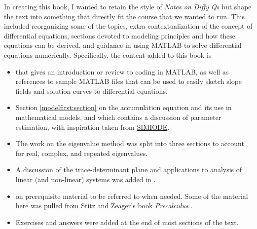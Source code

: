 In creating this book, I wanted to retain the style of \emph{Notes on Diffy Qs} \cite{JL} but shape the text into something that directly fit the course that we wanted to run. This included reorganizing some of the topics, extra contextualization of the concept of differential equations, sections devoted to modeling principles and how these equations can be derived, and guidance in using MATLAB to solve differential equations numerically. Specifically, the content added to this book is
\begin{itemize}
\item {} that gives an introduction or review to coding in MATLAB, as well as references to sample MATLAB files that can be used to easily sketch slope fields and solution curves to differential equations.
\item Section \ref{modelfirst:section} on the accumulation equation and its use in mathematical models, and  which contains a discussion of parameter estimation, with inspiration taken from \href{https://www.simiode.org/}{SIMIODE}.
\item The work on the eigenvalue method was split into three sections to account for real, complex, and repeated eigenvalues. 
\item A discussion of the trace-determinant plane and applications to analysis of linear (and non-linear) systems was added in .
\item {} on prerequisite material to be referred to when needed. Some of the material here was pulled from Stitz and Zeager's book \emph{Precalculus} \cite{SZ}.
\item Exercises and answers were added at the end of most sections of the text.
\end{itemize}


